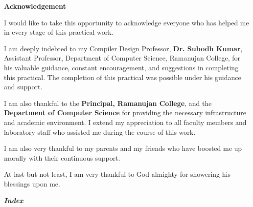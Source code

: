\documentclass[12pt]{article}
\begin{document}
\newpage
\begin{center}
{\fontsize{26pt}{32pt}\selectfont\bfseries Acknowledgement}
\end{center}

\vspace{16pt}
{\large
I would like to take this opportunity to acknowledge everyone who has helped me in every stage of this practical work.

I am deeply indebted to my Compiler Design Professor, \textbf{Dr. Subodh Kumar}, Assistant Professor, Department of Computer Science, Ramanujan College, for his valuable guidance, constant encouragement, and suggestions in completing this practical. The completion of this practical was possible under his guidance and support.

I am also thankful to the \textbf{Principal, Ramanujan College}, and the \textbf{Department of Computer Science} for providing the necessary infrastructure and academic environment. I extend my appreciation to all faculty members and laboratory staff who assisted me during the course of this work.

I am also very thankful to my parents and my friends who have boosted me up morally with their continuous support.

At last but not least, I am very thankful to God almighty for showering his blessings upon me.
}

\newpage
\begin{center}
{\fontsize{40pt}{30pt}\selectfont\bfseries\itshape\color{rcblue} Index}
\end{center}

\vspace{10pt}
\end{document}
